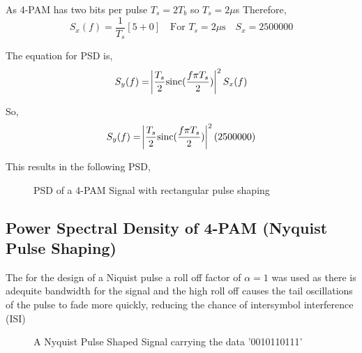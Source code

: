 As 4-PAM has two bits per pulse $T_s = 2 T_b$ so $T_s = 2 \mu$s Therefore,
\begin{equation}
    \label{eqn:sx-real}
    S_x(f) = \frac{1}{T_s} [5 + 0] \quad \textrm{For $T_s = 2\mu$s} \quad S_x=2500000
\end{equation}

The equation for PSD is,
\begin{equation}
    \label{eqn:PSD-4-PAM-rect}
    S_y(f) = \abs{\frac{T_s}{2} \textrm{sinc} ( \frac{f \pi T_s}{2} )}^2 S_x(f)
\end{equation}

So,
\begin{equation}
    \label{eqn:sy-value}
    S_y(f) = \abs{\frac{T_s}{2} \textrm{sinc}({\frac{f \pi T_s}{2}})}^2 (2500000)
\end{equation}
    
This results in the following PSD,
\begin{figure}[h]
    \begin{center}
        
        \caption{PSD of a 4-PAM Signal with rectangular pulse shaping}
    \end{center}
\end{figure}

\subsection{Power Spectral Density of 4-PAM (Nyquist Pulse Shaping)}
The for the design of a Niquist pulse a roll off factor of $\alpha = 1$ was used as there is adequite bandwidth
for the signal and the high roll off causes the tail oscillations of the pulse to fade more quickly, reducing the
chance of intersymbol interference (ISI)

\begin{figure}[h]
    \begin{center}
        
    \end{center}
    \caption{A Nyquist Pulse Shaped Signal carrying the data '0010110111'}
\end{figure}


    